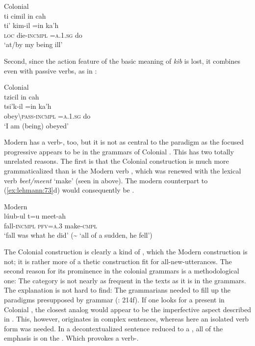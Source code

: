 \documentclass[output=paper]{langsci/langscibook}
\begin{document}
\ea\label{ex:lehmann:75}
Colonial  \\
      ti    cimil      in        cah\\
\gll   ti’    kim-il      =in      ka’h\\
  \textsc{loc}  die-\textsc{incmpl} \textsc{=a.1.sg}    do\\
\glt ‘at/by my being ill’ \citep[58]{Coronel1620}
\z

Second, since the action feature of the basic meaning of \textit{kib} is lost, it combines even with passive verbs, as in :

\ea\label{ex:lehmann:76}
Colonial  \\
      tzicil           in       cah\\
\gll   tsi’k-il          =in      ka’h\\
obey{\textbackslash}\textsc{pass-incmpl} \textsc{=a.1.sg}    do\\
\glt ‘I am (being) obeyed’ \citep[11v]{SanBuenaventura1684}
\z

Modern   has a verb-, too, but it is not as central to the  paradigm as the focused progressive appears to be in the grammars of Colonial  . This has two totally unrelated reasons. The first is that the Colonial   construction is much more grammaticalized than is the Modern   verb , which was renewed with the lexical verb \textit{beet/meent} ‘make’ (seen in  above). The modern counterpart to (\ref{ex:lehmann:73}d) would consequently be .

\ea\label{ex:lehmann:77}
Modern  \\
\gll       lúub-ul    t=u      meet-ah\\
  fall-\textsc{incmpl} \textsc{pfv=a.3}  make-\textsc{cmpl}\\
\glt ‘fall was what he did’ ({\textasciitilde} ‘all of a sudden, he fell’)
\z

\label{ref:present}The Colonial   construction is clearly a kind of , which the Modern   construction is not; it is rather more of a thetic construction fit for all-new-utterances. The second reason for its prominence in the colonial grammars is a methodological one: The category is not nearly as frequent in the texts as it is in the grammars. The explanation is not hard to find:\label{lehmann:methomistake} The grammarians needed to fill up the  paradigms presupposed by  grammar (\citealt{Hanks2010}: 214f). If one looks for a present  in Colonial  , the closest analog would appear to be the imperfective aspect described in . This, however, originates in complex sentences, whereas here an isolated verb form was needed. In a decontextualized sentence reduced to a , all of the emphasis is on the . Which provokes a verb-.
\end{document}
